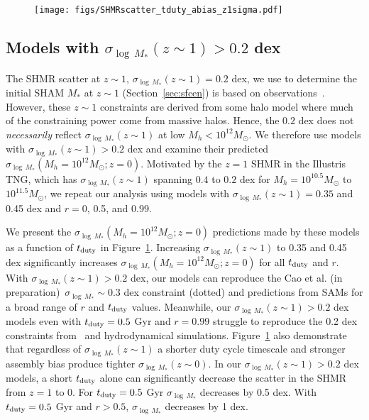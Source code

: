 \documentclass[12pt, letterpaper, preprint, tighten]{aastex62}
\newcommand{\edt}[1]{{\color{dred}{\bf} #1}}
\newcommand{\cao}{Cao et al. (in preparation)}
\newcommand{\tduty}{t_{\rm duty}}
\begin{document}
\begin{figure}
\begin{center}
    \texttt{[image: figs/SHMRscatter\_tduty\_abias\_z1sigma.pdf]}
    \caption{}
\label{fig:sM_duty_abias_z1}
\end{center}
\end{figure}

\subsection{\edt{Models with  $\sigma_{\log\,M_*}(z\sim1) > 0.2$ dex}}
\edt{
The SHMR scatter at $z\sim1$, $\sigma_{\log\,M_*}(z\sim1) = 0.2$ dex, we 
use to determine the initial SHAM $M_*$ at $z\sim1$ (Section~\ref{sec:sfcen}) 
is based on observations~\citep[\emph{e.g.}][]{leauthaud2012, tinker2013, patel2015}.
However, these $z\sim1$ constraints are derived from some halo model where 
much of the constraining power come from massive halos. Hence, the $0.2$ dex 
does not {\em necessarily} reflect $\sigma_{\log\,M_*}(z\sim1)$ at low 
$M_h < 10^{12}M_\odot$. We therefore use models with 
$\sigma_{\log\,M_*}(z\sim1) > 0.2$ dex and examine their predicted 
$\sigma_{\log\,M_*}(M_h=10^{12}M_\odot; z=0)$.
Motivated by the $z=1$ SHMR in the Illustris TNG, which has 
$\sigma_{\log\,M_*}(z\sim1)$ spanning $0.4$ to $0.2$ dex for $M_h = 10^{10.5}M_\odot$ 
to $10^{11.5}M_\odot$, we repeat our analysis using models with 
$\sigma_{\log\,M_*}(z\sim1) = 0.35$ and 0.45 dex and $r=0$, 0.5, 
and 0.99. 
}

\edt{
We present the $\sigma_{\log\,M_*}(M_h=10^{12}M_\odot; z=0)$ 
predictions made by these models as a function of $\tduty$ in 
Figure~\ref{fig:sM_duty_abias_z1}. Increasing $\sigma_{\log\,M_*}(z\sim1)$ 
to 0.35 and 0.45 dex significantly increases $\sigma_{\log\,M_*}(M_h=10^{12}M_\odot; z=0)$ 
for all $\tduty$ and $r$.
With $\sigma_{\log\,M_*}(z\sim1) > 0.2$ dex, our models can reproduce 
the \cao~$\sigma_{\log\,M_*}\sim 0.3$ dex constraint (dotted) and predictions 
from SAMs for a broad range of $r$ and $\tduty$ values. Meanwhile, our
$\sigma_{\log\,M_*}(z\sim1) > 0.2$ dex models even with $\tduty = 0.5$ Gyr
and $r=0.99$ struggle to reproduce the 0.2 dex constraints from~\cite{more2011, leauthaud2012, reddick2013, tinker2013, zu2015} 
and hydrodynamical simulations. 
Figure~\ref{fig:sM_duty_abias_z1} also demonstrate that regardless of 
$\sigma_{\log\,M_*}(z\sim1)$ a shorter duty cycle timescale and stronger 
assembly bias produce tighter $\sigma_{\log\,M_*}(z\sim0)$. In our 
$\sigma_{\log\,M_*}(z\sim1) > 0.2$ dex models, a short $\tduty$ alone can 
significantly decrease the scatter in the SHMR from $z=1$ to 0. For 
$\tduty=0.5$ Gyr $\sigma_{\log\,M_*}$ decreases by 0.5 dex. With 
$\tduty=0.5$ Gyr and $r > 0.5$, $\sigma_{\log\,M_*}$ decreases by 1 dex.
}
 
\end{document}
